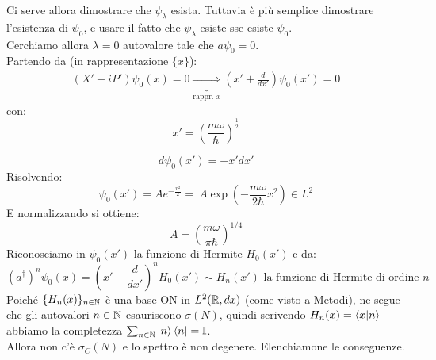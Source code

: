 \documentclass[../../FisicaTeorica.tex]{subfiles}
\begin{document}
Ci serve allora dimostrare che $\psi_\lambda$ esista. Tuttavia è più semplice dimostrare l'esistenza di $\psi_0$, e usare il fatto che $\psi_\lambda$ esiste sse esiste $\psi_0$.\\
Cerchiamo allora $\lambda=0$ autovalore tale che $a \psi_0 = 0$.\\
Partendo da (in rappresentazione $\{x\}$):
\begin{align*}
(X'+iP')\psi_0(x) = 0 \underbrace{\Rightarrow}_{\text{rappr. $x$}} \left(x'+\frac{d}{dx'}\right)\psi_0 (x') = 0
\end{align*}
con:
\[
x'=\left( \frac{m\omega}{\hbar}\right)^{\frac{1}{2}}
\]

\[
d\psi_0(x') = -x'dx'
\]
Risolvendo:
\[
\psi_0(x') = Ae^{-\frac{x^2}{2}} =\ A \exp\left(-\frac{m\omega}{2\hbar}x^2\right) \in L^2
\]
E normalizzando si ottiene:
\[
A = \left(\frac{m\omega}{\pi \hbar}\right)^{1/4}
\]
Riconosciamo in $\psi_0(x')$ la funzione di Hermite $H_0(x')$ e da:
\[
(a^\dag)^n \psi_0(x) = \left(x'-\frac{d}{dx'}\right)^n H_0(x') \sim H_n(x') \text{ la funzione di Hermite di ordine $n$}
\]
Poiché $\{H_n(x)\}_{n\in \mathbb{N}}$ è una base ON in $L^2(\mathbb{R},dx)$ (come visto a Metodi), ne segue che gli autovalori $n\in \mathbb{N}$ esauriscono $\sigma(N)$, quindi scrivendo $H_n(x)=\braket{x|n}$ abbiamo la completezza $\sum_{n\in \mathbb{N}}\ket{n}\bra{n}=\mathbb{I}$.\\
Allora non c'è $\sigma_C(N)$ e lo spettro è non degenere. Elenchiamone le conseguenze.
\end{document}
